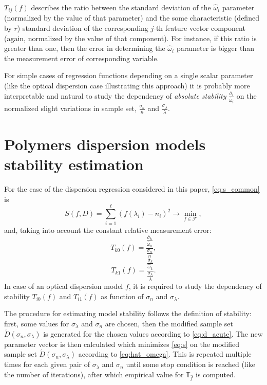 \documentclass[11pt,a4paper]{article}
\theoremstyle{definition}
\begin{document}
$T_{ij}(f)$ describes the ratio between the standard deviation of the $\hat{\omega}_i$ parameter
(normalized by the value of that parameter) and the some characteristic (defined by $r$)
standard deviation of the corresponding $j$-th feature vector component (again, normalized by
the value of that component).
For instance, if this ratio is greater than one, then the error in determining the $\hat{\omega}_i$
parameter is bigger than the measurement error of corresponding variable.

For simple cases of regression functions depending on a single scalar parameter (like the optical
dispersion case illustrating this approach) it is probably more interpretable and natural to study the
dependency of \emph{absolute stability} $\frac{\overline{\sigma}_i}{\hat{\omega}_i}$ on the
normalized slight variations in sample set, $\frac{\sigma_n}{n}$ and $\frac{\sigma_{\lambda}}{\lambda}$.

\section{Polymers dispersion models stability estimation}

For the case of the dispersion regression considered in this paper, \eqref{eq:s_common}
is
\begin{equation}
  S(f, D) = \sum_{i = 1}^\ell (f(\lambda_i) - n_i)^2 \rightarrow \min_{f \in \mathcal{F}},
  \label{eq:s}
\end{equation}
and, taking into account the constant relative measurement error:
\[
  T_{k0}(f) = \frac{\frac{\overline{\sigma}_k}{\hat{\omega}_k}}{\frac{\sigma_n}{n}},
\]
\[
  T_{k1}(f) = \frac{\frac{\overline{\sigma}_k}{\hat{\omega}_k}}{\frac{\sigma_{\lambda}}{\lambda}}.
\]
In case of an optical dispersion model $f$, it is required to study the
dependency of stability $T_{i0}(f)$ and $T_{i1}(f)$ as function of
$\sigma_n$ and $\sigma_{\lambda}$.

The procedure for estimating model stability follows the definition of stability:
first, some values for $\sigma_{\lambda}$ and $\sigma_n$ are chosen,
then the modified sample set $\acute{D}(\sigma_n, \sigma_{\lambda})$ is
generated for the chosen values according to \eqref{eq:d_acute}. The new
parameter vector is then calculated which minimizes \eqref{eq:s} on the
modified sample set $\acute{D}(\sigma_n, \sigma_{\lambda})$ according to
\eqref{eq:hat_omega}.
This is repeated multiple times for each given pair of $\sigma_{\lambda}$ and $\sigma_n$
until some stop condition is reached (like the number of iterations), after which
empirical value for $\mathbb{T}_{\hat{f}}$ is computed.
\end{document}
